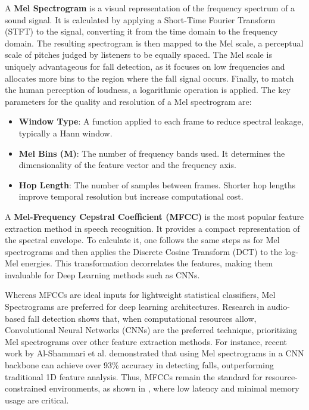 \documentclass[11pt, a4paper, twoside]{article}
\begin{document}
A \textbf{Mel Spectrogram} \cite{kaur2022fall} is a visual representation of the frequency spectrum of a sound signal. It is calculated by applying a Short-Time Fourier Transform (STFT) to the signal, converting it from the time domain to the frequency domain. The resulting spectrogram is then mapped to the Mel scale, a perceptual scale of pitches judged by listeners to be equally spaced. The Mel scale is uniquely advantageous for fall detection, as it focuses on low frequencies and allocates more bins to the region where the fall signal occurs. Finally, to match the human perception of loudness, a logarithmic operation is applied. The key parameters for the quality and resolution of a Mel spectrogram are:

\begin{itemize}
\item \textbf{Window Type}: A function applied to each frame to reduce spectral leakage, typically a Hann window.
\item \textbf{Mel Bins (M)}: The number of frequency bands used. It determines the dimensionality of the feature vector and the frequency axis.
\item \textbf{Hop Length}: The number of samples between frames. Shorter hop lengths improve temporal resolution but increase computational cost.
\end{itemize}

A \textbf{Mel-Frequency Cepstral Coefficient (MFCC)} \cite{babaee2017overview} is the most popular feature extraction method in speech recognition. It provides a compact representation of the spectral envelope. To calculate it, one follows the same steps as for Mel spectrograms and then applies the Discrete Cosine Transform (DCT) to the log-Mel energies. This transformation decorrelates the features, making them invaluable for Deep Learning methods such as CNNs.

Whereas MFCCs are ideal inputs for lightweight statistical classifiers, Mel Spectrograms are preferred for deep learning architectures. Research in audio-based fall detection shows that, when computational resources allow, Convolutional Neural Networks (CNNs) are the preferred technique, prioritizing Mel spectrograms over other feature extraction methods. For instance, recent work by Al-Shammari et al. \cite{alshammari2025} demonstrated that using Mel spectrograms in a CNN backbone can achieve over 93\% accuracy in detecting falls, outperforming traditional 1D feature analysis. Thus, MFCCs remain the standard for resource-constrained environments, as shown in \cite{guillem2013improving}, where low latency and minimal memory usage are critical.
\end{document}

